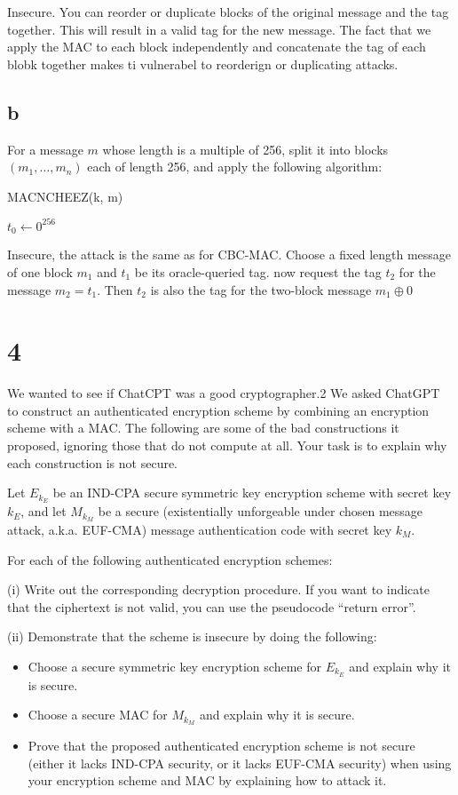 \documentclass[11pt]{article}
\begin{document}
Insecure. You can reorder or duplicate blocks of the original message and the tag together. This will result in a valid tag for the new message. The fact that we apply the MAC to each block independently and concatenate the tag of each blobk together makes ti vulnerabel to reorderign or duplicating attacks.

\subsection{b}

For a message $m$ whose length is a multiple of 256, split it into blocks $(m_1, \ldots, m_n)$ each of length 256, and apply the following algorithm:

\begin{algorithm}
    \caption{MACNCHEEZ(k, m)}
    $t_0 \gets 0^{256}$
\end{algorithm}

Insecure, the attack is the same as for CBC-MAC. Choose a fixed length message of one block $m_1$ and $t_1$ be its oracle-queried tag. now request the tag $t_2$ for the message $m_2 = t_1$. Then $t_2$ is also the tag for the two-block message $m_1 \oplus 0$ 

\newpage

\section{4}
We wanted to see if ChatCPT was a good cryptographer.2 We asked ChatGPT to construct an authenticated encryption scheme by combining an encryption scheme with a MAC. The following are some of the bad constructions it proposed, ignoring those that do not compute at all. Your task is to explain why each construction is not secure.

Let $E_{k_E}$ be an IND-CPA secure symmetric key encryption scheme with secret key $k_E$, and let $M_{k_M}$ be a secure (existentially unforgeable under chosen message attack, a.k.a. EUF-CMA) message authentication code with secret key $k_M$.

For each of the following authenticated encryption schemes:

(i) Write out the corresponding decryption procedure. If you want to indicate that the ciphertext is not valid, you can use the pseudocode “return error”.

(ii) Demonstrate that the scheme is insecure by doing the following:
\begin{itemize}
    \item Choose a secure symmetric key encryption scheme for $E_{k_E}$ and explain why it is secure.
    \item Choose a secure MAC for $M_{k_M}$ and explain why it is secure.
    \item Prove that the proposed authenticated encryption scheme is not secure (either it lacks
    IND-CPA security, or it lacks EUF-CMA security) when using your encryption scheme and MAC by explaining how to attack it.
\end{itemize}
\end{document}
